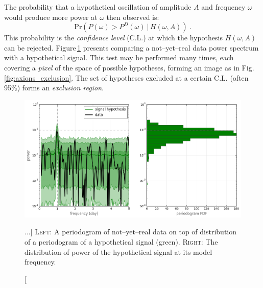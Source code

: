 The probability that a hypothetical oscillation of amplitude $A$ and frequency $\omega$ would produce more power at $\omega$ then observed is:
\begin{equation}
  \mathrm{Pr}\left( P(\omega) > P^D(\omega)\ |\, H(\omega, A) \right) \ .
\end{equation}
This probability is the \emph{confidence level} (C.L.) at which the hypothesis $H(\omega, A)$ can be rejected. Figure\,\ref{fig:axions_signal_rejection} presents comparing a not--yet--real data power spectrum with a hypothetical signal. This test may be performed many times, each covering a \emph{pixel} of the space of possible hypotheses, forming an image as in Fig.\,\ref{fig:axions_exclusion}. The set of hypotheses excluded at a certain C.L. (often 95\%) forms an \emph{exclusion region}.

\begin{figure}[bth]
  \myfloatalign
  \includegraphics[width=.8\linewidth]{gfx/axions/axionMC_signal_hypothesis_rejection}
  \caption
  [...]
  {
\textsc{Left:} A periodogram of not--yet--real data on top of distribution of a periodogram of a hypothetical signal (green). \textsc{Right:} The distribution of power of the hypothetical signal at its model frequency.}
  \label{fig:axions_signal_rejection}
\end{figure}

